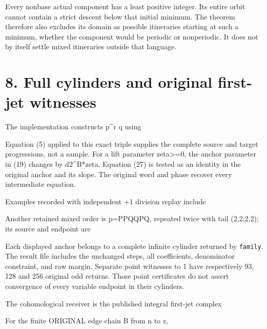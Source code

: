 Every nonbase actual component has a least positive integer. Its entire
orbit cannot contain a strict descent below that initial minimum. The
theorem therefore also excludes its domain as possible itineraries
starting at such a minimum, whether the component would be periodic or
nonperiodic. It does not by itself settle mixed itineraries outside that
language.

\section{8. Full cylinders and original first-jet witnesses}

The implementation constructs p\^{}r q using


Equation (5) applied to this exact triple supplies the complete source
and target progressions, not a sample. For a lift parameter
zeta\textgreater=0, the anchor parameter in (19) changes by
d2\^{}B*zeta. Equation (27) is tested as an identity in the original
anchor and its slope. The original word and phase recover every
intermediate equation.

Examples recorded with independent +1 division replay include


Another retained mixed order is p=PPQQPQ, repeated twice with tail
(2,2,2,2); its source and endpoint are


Each displayed anchor belongs to a complete infinite cylinder returned
by \nolinkurl{family}. The result file includes the unchanged steps, all
coefficients, denominator constraint, and raw margin. Separate point
witnesses to 1 have respectively 93, 128 and 256 original odd returns.
Those point certificates do not assert convergence of every variable
endpoint in their cylinders.

The cohomological receiver is the published integral first-jet complex


For the finite ORIGINAL edge chain B from n to z,


